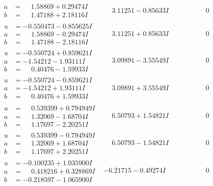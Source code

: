 \documentclass[1p]{elsarticle_modified}
\theoremstyle{definition}
\begin{document}
$$\begin{array}{c|c|c}
\begin{aligned}
a &= \phantom{-}1.58869 + 0.29474 I \\
b &= \phantom{-}1.47188 + 2.18116 I\end{aligned}
 & \phantom{-}3.11251 - 0.85633 I & \phantom{-0.000000 } 0 \\ \hline\begin{aligned}
u &= -0.550473 - 0.855625 I \\
a &= \phantom{-}1.58869 - 0.29474 I \\
b &= \phantom{-}1.47188 - 2.18116 I\end{aligned}
 & \phantom{-}3.11251 + 0.85633 I & \phantom{-0.000000 } 0 \\ \hline\begin{aligned}
u &= -0.550724 + 0.859621 I \\
a &= -1.54212 - 1.93111 I \\
b &= \phantom{-}0.40476 - 1.59933 I\end{aligned}
 & \phantom{-}3.09891 - 3.55549 I & \phantom{-0.000000 } 0 \\ \hline\begin{aligned}
u &= -0.550724 - 0.859621 I \\
a &= -1.54212 + 1.93111 I \\
b &= \phantom{-}0.40476 + 1.59933 I\end{aligned}
 & \phantom{-}3.09891 + 3.55549 I & \phantom{-0.000000 } 0 \\ \hline\begin{aligned}
u &= \phantom{-}0.539399 + 0.794949 I \\
a &= \phantom{-}1.32069 - 1.68704 I \\
b &= \phantom{-}1.17697 - 2.20251 I\end{aligned}
 & \phantom{-}6.50793 + 1.54821 I & \phantom{-0.000000 } 0 \\ \hline\begin{aligned}
u &= \phantom{-}0.539399 - 0.794949 I \\
a &= \phantom{-}1.32069 + 1.68704 I \\
b &= \phantom{-}1.17697 + 2.20251 I\end{aligned}
 & \phantom{-}6.50793 - 1.54821 I & \phantom{-0.000000 } 0 \\ \hline\begin{aligned}
u &= -0.100235 + 1.035900 I \\
a &= \phantom{-}0.418216 + 0.328869 I \\
b &= -0.218597 - 1.065900 I\end{aligned}
 & -6.21715 - 0.49274 I & \phantom{-0.000000 } 0 \\ \hline\begin{aligned}

\end{aligned}
\end{array}$$
\end{document}
